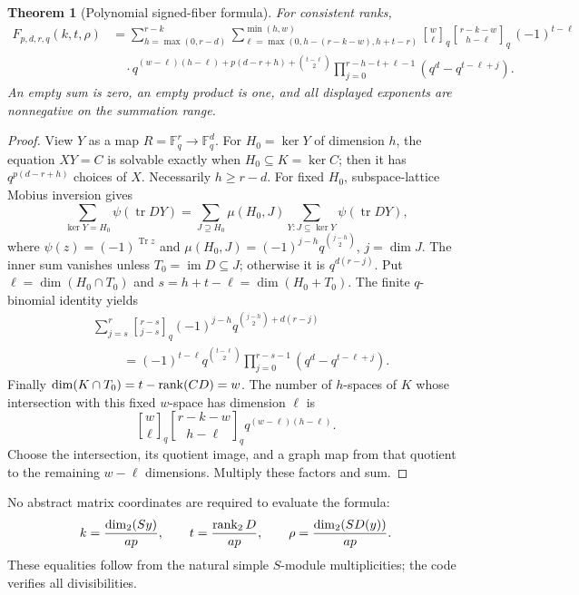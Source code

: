 \documentclass[11pt]{article}
\newtheorem{theorem}{Theorem}\newtheorem{lemma}{Lemma}
\newcommand{\F}{\mathbb F}\newcommand{\Hom}{\operatorname{Hom}}
\begin{document}
\begin{theorem}[Polynomial signed-fiber formula]
For consistent ranks,
\begin{align*}
 F_{p,d,r,q}(k,t,\rho)
 &=\sum_{h=\max(0,r-d)}^{r-k}
 \sum_{\ell=\max(0,h-(r-k-w),h+t-r)}^{\min(h,w)}
 {w\brack\ell}_q {r-k-w\brack h-\ell}_q\,(-1)^{t-\ell}\\
 &\quad\cdot q^{(w-\ell)(h-\ell)+p(d-r+h)+\binom{t-\ell}{2}}
 \prod_{j=0}^{r-h-t+\ell-1}(q^d-q^{t-\ell+j}).
\end{align*}
An empty sum is zero, an empty product is one, and all displayed exponents
are nonnegative on the summation range.
\end{theorem}
\begin{proof}
View $Y$ as a map $R=\F_q^r\to\F_q^d$. For $H_0=\ker Y$ of dimension
$h$, the equation $XY=C$ is solvable exactly when $H_0\subseteq K=\ker C$;
then it has $q^{p(d-r+h)}$ choices of $X$. Necessarily $h\geq r-d$.
For fixed $H_0$, subspace-lattice Mobius inversion gives
\[
 \sum_{\ker Y=H_0}\psi(\operatorname{tr}DY)
 =\sum_{J\supseteq H_0}\mu(H_0,J)
       \sum_{Y:J\subseteq\ker Y}\psi(\operatorname{tr}DY),
\]
where $\psi(z)=(-1)^{\operatorname{Tr}z}$ and
$\mu(H_0,J)=(-1)^{j-h}q^{\binom{j-h}{2}}$, $j=\dim J$.
The inner sum vanishes unless $T_0=\operatorname{im}D\subseteq J$;
otherwise it is $q^{d(r-j)}$. Put $\ell=\dim(H_0\cap T_0)$ and
$s=h+t-\ell=\dim(H_0+T_0)$. The finite $q$-binomial identity yields
\begin{align*}
 &\sum_{j=s}^r {r-s\brack j-s}_q(-1)^{j-h}
       q^{\binom{j-h}{2}+d(r-j)}\\
 &\hspace{1cm}=(-1)^{t-\ell}q^{\binom{t-\ell}{2}}
       \prod_{j=0}^{r-s-1}(q^d-q^{t-\ell+j}).
\end{align*}
Finally $\dim(K\cap T_0)=t-\operatorname{rank}(CD)=w$. The number of $h$-spaces of $K$
whose intersection with this fixed $w$-space has dimension $\ell$ is
\[
 {w\brack\ell}_q {r-k-w\brack h-\ell}_q q^{(w-\ell)(h-\ell)}.
\]
Choose the intersection, its quotient image, and a graph map from that quotient
to the remaining $w-\ell$ dimensions. Multiply these factors and sum.
\end{proof}

No abstract matrix coordinates are required to evaluate the formula:
\[
 k=\frac{\dim_2(Sy)}{ap},\qquad
 t=\frac{\operatorname{rank}_2D}{ap},\qquad
 \rho=\frac{\dim_2(SD(y))}{ap}.
\]
These equalities follow from the natural simple $S$-module multiplicities;
the code verifies all divisibilities.
\end{document}

